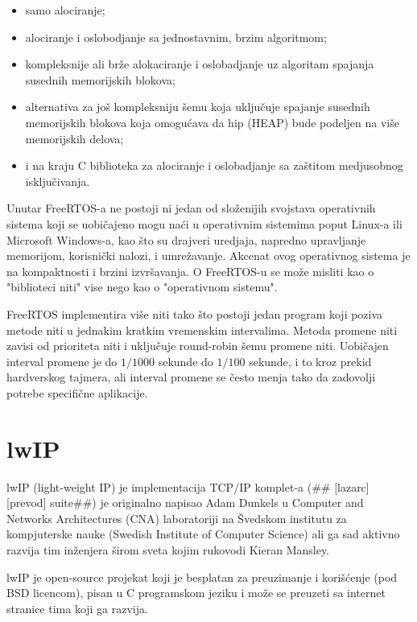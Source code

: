\documentclass[a4paper,12pt, master]{etf}
\begin{document}
	\begin{itemize}
		\item samo alociranje;
		\item alociranje i oslobodjanje sa jednostavnim, brzim algoritmom;
		\item kompleksnije ali br\v{z}e alokaciranje i oslobadjanje uz 
		algoritam spajanja susednih memorijskih blokova;
		\item alternativa za jo\v{s} kompleksniju \v{s}emu koja uklju\v{c}uje 
		spajanje susednih memorijskih blokova koja omogu\'{c}ava da hip (HEAP) 
		bude podeljen na vi\v{s}e memorijskih delova;
		\item i na kraju C biblioteka za alociranje i oslobadjanje sa 
		za\v{s}titom medjusobnog isklju\v{c}ivanja.
	\end{itemize}

	Unutar FreeRTOS-a ne postoji ni jedan od slo\v{z}enijih svojstava 
	operativnih sistema koji se	uobi\v{c}ajeno mogu na\'{c}i u operativnim 
	sistemima poput Linux-a ili Microsoft Windows-a, kao \v{s}to su drajveri 
	uredjaja, napredno upravljanje memorijom, korisni\v{c}ki nalozi, i
	umre\v{z}avanje. Akcenat ovog operativnog sistema je na kompaktnosti i 
	brzini izvr\v{s}avanja. O FreeRTOS-u se mo\v{z}e misliti kao o "biblioteci 
	niti" vise nego kao o "operativnom sistemu".

	FreeRTOS implementira vi\v{s}e niti tako \v{s}to postoji jedan program koji 
	poziva metode niti u jednakim kratkim vremenskim intervalima. Metoda 
	promene niti zavisi od prioriteta niti i uklju\v{c}uje round-robin \v{s}emu 
	promene niti. Uobi\v{c}ajen interval promene je do $1/1000$ sekunde
	do $1/100$ sekunde, i to kroz prekid hardverskog tajmera, ali interval 
	promene se \v{c}esto menja tako da zadovolji potrebe specifi\v{c}ne 
	aplikacije.

	\section{lwIP}

	lwIP (light-weight IP) je implementacija TCP/IP komplet-a (\#\# [lazarc] 
	[prevod] suite\#\#) je originalno napisao Adam Dunkels u Computer and 
	Networks Architectures (CNA) laboratoriji na \v{S}vedskom institutu za 
	kompjuterske nauke (Swedish Institute of Computer Science) ali ga sad	
	aktivno razvija tim in\v{z}enjera \v{s}irom sveta kojim rukovodi Kieran
	Mansley\@.

	lwIP je open-source projekat koji je besplatan za preuzimanje i 
	kori\v{s}\'{c}enje (pod BSD	licencom), pisan u C programskom jeziku i 
	mo\v{z}e se preuzeti sa internet stranice tima koji	ga razvija.
\end{document}
